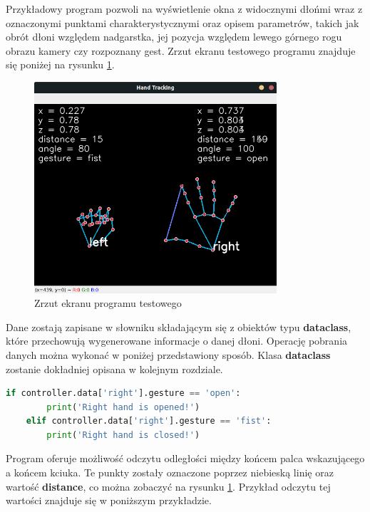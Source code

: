 \quad Przykładowy program pozwoli na wyświetlenie okna z widocznymi dłońmi wraz z oznaczonymi punktami charakterystycznymi oraz opisem parametrów, takich jak obrót dłoni względem nadgarstka, jej pozycja względem lewego górnego rogu obrazu kamery czy rozpoznany gest. Zrzut ekranu testowego programu znajduje się poniżej na rysunku \ref{fig:prog_screen_1}. 

\begin{figure}[H]
    \begin{center}
        \includegraphics[width=9cm]{../images/example_program.png}
        \caption{Zrzut ekranu programu testowego}
        \label{fig:prog_screen_1}
    \end{center}
\end{figure}

\quad Dane zostają zapisane w słowniku składającym się z obiektów typu \textbf{dataclass}, które przechowują wygenerowane informacje o danej dłoni. Operację pobrania danych można wykonać w poniżej przedstawiony sposób. Klasa \textbf{dataclass} zostanie dokładniej opisana w kolejnym rozdziale.

\begin{lstlisting}[language=python, style=programming, caption={Odczyt gestów}, label={lst:get_data1}]
    if controller.data['right'].gesture == 'open':
        print('Right hand is opened!')
    elif controller.data['right'].gesture == 'fist':
        print('Right hand is closed!')
\end{lstlisting}

\quad Program oferuje możliwość odczytu odległości między końcem palca wskazującego a końcem kciuka. Te punkty zostały oznaczone poprzez niebieską linię oraz wartość \textbf{distance}, co można zobaczyć na rysunku \ref{fig:prog_screen_1}. Przykład odczytu tej wartości znajduje się w poniższym przykładzie. 


